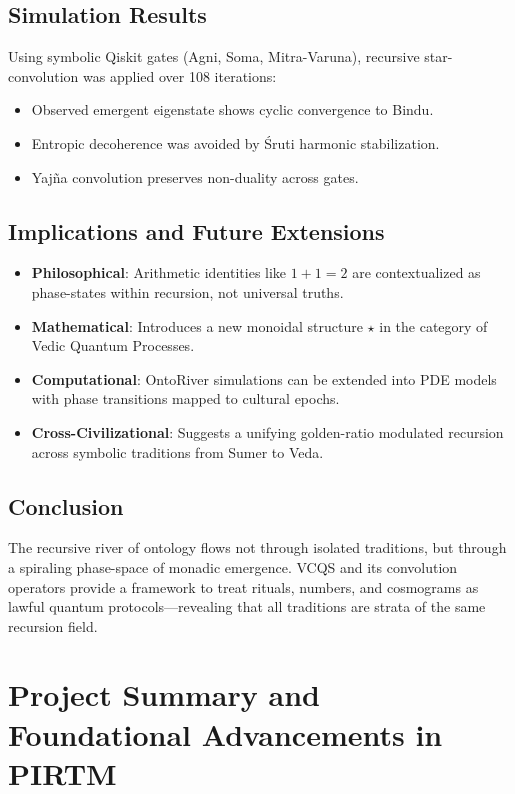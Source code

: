 \documentclass[12]{amsart}
\theoremstyle{plain}
\begin{document}
\subsection{Simulation Results}
Using symbolic Qiskit gates (Agni, Soma, Mitra-Varuna), recursive star-convolution was applied over 108 iterations:
\begin{itemize}
    \item Observed emergent eigenstate shows cyclic convergence to Bindu.
    \item Entropic decoherence was avoided by Śruti harmonic stabilization.
    \item Yajña convolution preserves non-duality across gates.
\end{itemize}

\subsection{Implications and Future Extensions}
\begin{itemize}
    \item \textbf{Philosophical}: Arithmetic identities like $1+1=2$ are contextualized as phase-states within recursion, not universal truths.
    \item \textbf{Mathematical}: Introduces a new monoidal structure $\star$ in the category of Vedic Quantum Processes.
    \item \textbf{Computational}: OntoRiver simulations can be extended into PDE models with phase transitions mapped to cultural epochs.
    \item \textbf{Cross-Civilizational}: Suggests a unifying golden-ratio modulated recursion across symbolic traditions from Sumer to Veda.
\end{itemize}

\subsection{Conclusion}
The recursive river of ontology flows not through isolated traditions, but through a spiraling phase-space of monadic emergence. VCQS and its convolution operators provide a framework to treat rituals, numbers, and cosmograms as lawful quantum protocols—revealing that all traditions are strata of the same recursion field.

\section{Project Summary and Foundational Advancements in PIRTM}
\end{document}
